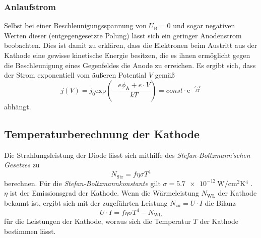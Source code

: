 \subsubsection{Anlaufstrom}
Selbst bei einer Beschleunigungsspannung von $U_\text{B} = 0$ und sogar negativen Werten dieser (entgegengesetzte Polung) lässt sich ein geringer Anodenstrom beobachten.
Dies ist damit zu erklären, dass die Elektronen beim Austritt aus der Kathode eine gewisse kinetische Energie besitzen, die es ihnen ermöglicht gegen die Beschleunigung
eines Gegenfeldes die Anode zu erreichen.
Es ergibt sich, dass der Strom exponentiell vom äußeren Potential $V$ gemäß
\begin{equation}
    \label{eqn:j_Anlauf}
    j(V) = j_0 \mathrm{exp}\left(-\frac{e\phi_\text{A} + e \cdot V}{kT} \right) = const \cdot \mathrm{e}^{-\frac{e \cdot V}{kT}}
\end{equation}
abhängt.

\subsection{Temperaturberechnung der Kathode}
\label{subsec:Temperatur_Kathode}
Die Strahlungsleistung der Diode lässt sich mithilfe des \textit{Stefan-Boltzmann'schen Gesetzes} zu 
\begin{equation*}
    N_\text{Str} = f \eta \sigma T^4
\end{equation*}
berechnen. Für die \textit{Stefan-Boltzmannkonstante} gilt $\sigma = \qty{5.7e-12}{\watt\per\centi\metre\squared\kelvin^4}$ \cite{scipy}. $\eta$ ist der Emissionsgrad
der Kathode. Wenn die Wärmeleistung $N_\text{WL}$ der Kathode bekannt ist, ergibt sich mit der zugeführten Leistung $N_\text{zu} = U \cdot I$ die Bilanz
\begin{equation}
    \label{eqn:Leistung}
    U \cdot I = f \eta \sigma T^4 - N_\text{WL}
\end{equation} 
für die Leistungen der Kathode, woraus sich die Temperatur $T$ der Kathode bestimmen lässt.
